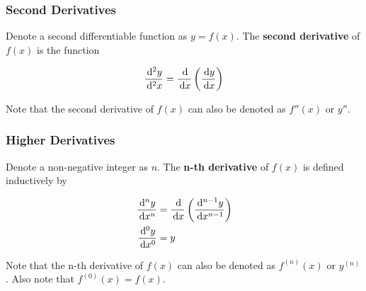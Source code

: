 \documentclass[a4paper,12pt]{article}
\begin{document}
\subsubsection{Second Derivatives}
\begin{dft}
  Denote a second differentiable function as $y=f(x)$. The \textbf{second derivative} of $f(x)$ is the function

  $$\frac{\,\mathrm{d}^2 y}{\,\mathrm{d}^2 x}=\frac{\,\mathrm{d}}{\,\mathrm{d} x}\left( \frac{\,\mathrm{d} y}{\,\mathrm{d} x}\right)$$
\end{dft}\n

Note that the second derivative of $f(x)$ can also be denoted as $f''(x)$ or $y''$.

\propdisp

\subsubsection{Higher Derivatives}
\begin{dft}
  Denote a non-negative integer as $n$. The \textbf{n-th derivative} of $f(x)$ is defined inductively by

  $$\begin{aligned}[t]
    \frac{\,\mathrm{d}^{n} y}{\,\mathrm{d} x^{n}}&=\frac{\,\mathrm{d}}{\,\mathrm{d} x}\left( \frac{\,\mathrm{d}^{n-1} y}{\,\mathrm{d} x^{n-1}}\right)\\
    \frac{\,\mathrm{d}^{0} y}{\,\mathrm{d} x^{0}}&=y
  \end{aligned}$$
\end{dft}\n

Note that the n-th derivative of $f(x)$ can also be denoted as $f^{(n)}(x)$ or $y^{(n)}$. Also note that $f^{(0)}(x)=f(x)$.
\end{document}
